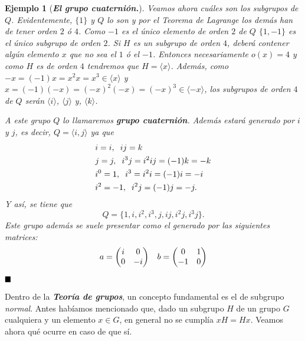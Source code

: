 \documentclass[12pt]{article}
\newtheorem{example}{Ejemplo}[theorem]
\begin{document}
\begin{example}[\textbf{\textit{El grupo cuaternión.}}]
Veamos ahora cuáles son los subgrupos de $Q$. Evidentemente, $\lbrace 1 \rbrace$ y $Q$ lo son y por el \textit{Teorema de Lagrange} los demás han de tener orden $2$ ó $4$. Como $-1$ es el único elemento de orden $2$ de $Q$ $\lbrace 1, -1 \rbrace$ es el único subgrupo de orden $2$. Si $H$ es un subgrupo de orden $4$, deberá contener algún elemento $x$ que no sea el $1$ ó el $-1$. Entonces necesariamente $o(x) = 4$ y como $H$ es de orden $4$ tendremos que $H = \langle x \rangle$. Además, como $-x = (-1)x = x^{2}x = x^{3} \in \langle x \rangle$ y $x  = (-1)(-x) = (-x)^{2}(-x) = (-x)^{3} \in \langle -x \rangle$, los subgrupos de orden $4$ de $Q$ serán $\langle i \rangle$, $\langle j \rangle$ y, $\langle k \rangle$.


A este grupo $Q$ lo llamaremos \textbf{\textit{grupo cuaternión}}. Además estará generado por $i$ y $j$, es decir, $Q = \langle i,j \rangle$ ya que \begin{equation*}
\begin{aligned}
&i = i, \hspace{0.2cm} ij = k\\
&j = j, \hspace{0.2cm} i^{3}j = i^{2}ij =(-1)k = -k\\
&i^{0} = 1, \hspace{0.2cm} i^{3} = i^{2}i = (-1)i = -i\\
&i^{2} = -1, \hspace{0.2cm} i^{2}j = (-1)j = -j.
\end{aligned}
\end{equation*}
Y así, se tiene que $$Q = \lbrace 1, i, i^{2}, i^{3}, j, ij, i^{2}j, i^{3}j \rbrace.$$
Este grupo además se suele presentar como el generado por las siguientes matrices: $$a = \left(
\begin{matrix}
i & 0 \\
0 & -i
\end{matrix}
\right) \hspace{0.3cm} b = \left(
\begin{matrix}
0 & 1 \\
-1 & 0
\end{matrix}
\right)$$
\end{example}
$\hfill \blacksquare$

Dentro de la \textbf{\textit{Teoría de grupos}}, un concepto fundamental es el de subgrupo \textit{normal}. Antes habíamos mencionado que, dado un subgrupo $H$ de un grupo $G$ cualquiera y un elemento $x\in G$, en general no se cumplía $xH = Hx$. Veamos ahora qué ocurre en caso de que sí.
\end{document}
